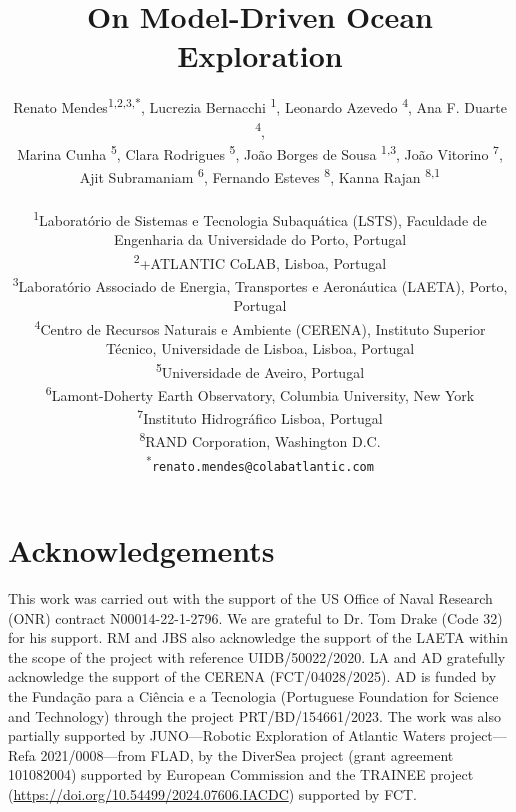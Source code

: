 \documentclass[11pt]{article}
\title{On Model-Driven Ocean Exploration}
\author{
Renato Mendes\textsuperscript{1,2,3,*},
Lucrezia Bernacchi \textsuperscript{1},
Leonardo Azevedo \textsuperscript{4},
Ana F. Duarte \textsuperscript{4},\\
Marina Cunha \textsuperscript{5},
Clara Rodrigues \textsuperscript{5},
João Borges de Sousa \textsuperscript{1,3},
João Vitorino \textsuperscript{7},\\
Ajit Subramaniam \textsuperscript{6},
Fernando Esteves \textsuperscript{8},
Kanna Rajan \textsuperscript{8,1}
\\
\\
\textsuperscript{1}{\scriptsize Laboratório de Sistemas e Tecnologia Subaquática (LSTS), Faculdade de Engenharia da Universidade do Porto, Portugal}\\
\textsuperscript{2}{\scriptsize +ATLANTIC CoLAB, Lisboa, Portugal}\\
\textsuperscript{3}{\scriptsize Laboratório Associado de Energia, Transportes e Aeronáutica (LAETA), Porto, Portugal}\\
\textsuperscript{4}{\scriptsize Centro de Recursos Naturais e Ambiente (CERENA), Instituto Superior T\'{e}cnico, Universidade de Lisboa, Lisboa, Portugal}\\
\textsuperscript{5}{\scriptsize Universidade de Aveiro, Portugal}\\
\textsuperscript{6}{\scriptsize Lamont-Doherty Earth Observatory, Columbia University, New York}\\
\textsuperscript{7}{\scriptsize Instituto Hidrogr{\'a}fico Lisboa, Portugal}\\
\textsuperscript{8}{\scriptsize RAND Corporation, Washington D.C.}\\
\textsuperscript{*}\texttt{{\scriptsize renato.mendes@colabatlantic.com}}
}
\date{}
\begin{document}
\maketitle






\section{Acknowledgements}

This work was carried out with the support of the US Office of Naval
Research (ONR) contract N00014-22-1-2796. We are grateful to
Dr. Tom Drake (Code 32) for his support. RM and JBS also acknowledge
the support of the LAETA within the scope of the project with
reference UIDB/50022/2020. LA and AD gratefully acknowledge the
support of the CERENA (FCT/04028/2025). AD is funded by the
Funda\c{c}\~{a}o para a Ci\^{e}ncia e a Tecnologia (Portuguese
Foundation for Science and Technology) through the project
PRT/BD/154661/2023. The work was also partially supported by
JUNO—Robotic Exploration of Atlantic Waters project—Refa
2021/0008—from FLAD, by the DiverSea project (grant agreement
101082004) supported by European Commission and the TRAINEE project
(\url{https://doi.org/10.54499/2024.07606.IACDC}) supported by FCT.


\footnotesize{
  
}
\end{document}

